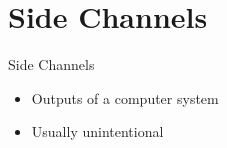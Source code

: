 
\section{Side Channels}\label{sec:sc}

\begin{frame}{Side Channels}
\begin{itemize}[<+-| alert@+>]
    \item Outputs of a computer system 
    \item Usually unintentional
\end{itemize}

\only<+->{}
\end{frame}
